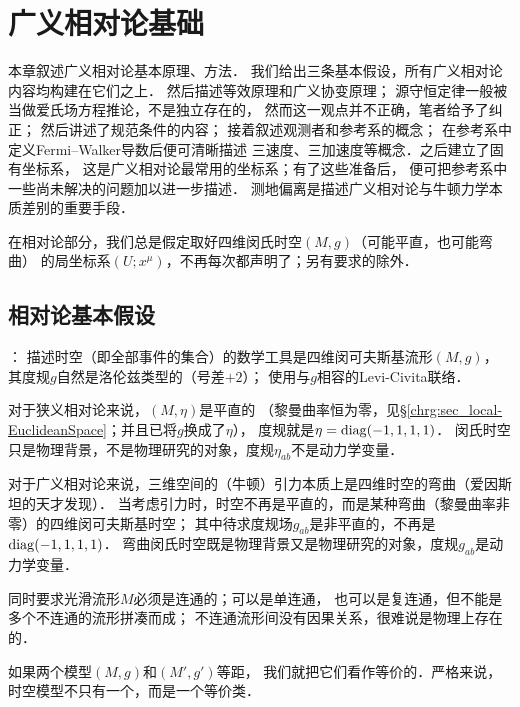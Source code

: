 
\chapter{广义相对论基础}\label{chfd}

本章叙述广义相对论基本原理、方法．
我们给出三条基本假设，所有广义相对论内容均构建在它们之上．
然后描述等效原理和广义协变原理；
源守恒定律一般被当做爱氏场方程推论，不是独立存在的，
然而这一观点并不正确，笔者给予了纠正；
然后讲述了规范条件的内容；
接着叙述观测者和参考系的概念；
在参考系中定义Fermi--Walker导数后便可清晰描述
三速度、三加速度等概念．之后建立了固有坐标系，
这是广义相对论最常用的坐标系；有了这些准备后，
便可把参考系中一些尚未解决的问题加以进一步描述．
测地偏离是描述广义相对论与牛顿力学本质差别的重要手段．



在相对论部分，我们总是假定取好四维闵氏时空$(M,g)$（可能平直，也可能弯曲）
的局坐标系$(U;x^\mu)$，不再每次都声明了；另有要求的除外．

\section{相对论基本假设}\label{chfd:sec_Fundamental-Postulate}

\noindent{}：
描述时空（即全部事件的集合）的数学工具是四维闵可夫斯基流形$(M,g)$，
其度规$g$自然是洛伦兹类型的（号差$+2$）；
使用与$g$相容的Levi-Civita联络．

对于狭义相对论来说，$(M,\eta)$是平直的
（黎曼曲率恒为零，见\S\ref{chrg:sec_local-EuclideanSpace}；并且已将$g$换成了$\eta$），
度规就是$\eta={\rm diag}(-1,1,1,1)$．
闵氏时空只是物理背景，不是物理研究的对象，度规$\eta_{ab}$不是动力学变量．


对于广义相对论来说，三维空间的（牛顿）引力本质上是四维时空的弯曲（爱因斯坦的天才发现）．
当考虑引力时，时空不再是平直的，而是某种弯曲（黎曼曲率非零）的四维闵可夫斯基时空；
其中待求度规场$g_{ab}$是非平直的，不再是${\rm diag}(-1,1,1,1)$．
弯曲闵氏时空既是物理背景又是物理研究的对象，度规$g_{ab}$是动力学变量．

同时要求光滑流形$M$必须是连通的；可以是单连通，
也可以是复连通，但不能是多个不连通的流形拼凑而成；
不连通流形间没有因果关系，很难说是物理上存在的．

如果两个模型$(M,g)$和$(M',g')${\kaishu 等距}，
我们就把它们看作等价的．严格来说，时空模型不只有一个，而是一个等价类．




